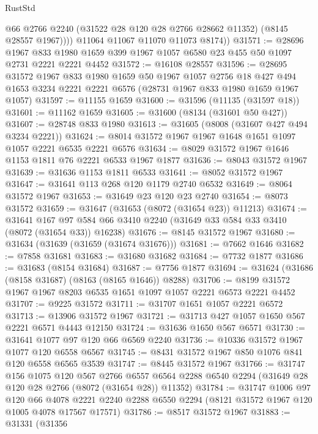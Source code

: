 \begin{lexlean}{RustStd}
\begin{coremodule}
              @66
              @2766
              @2240
              (@31522 @28 @120 @28 @2766 @28662 @11352)
              (@8145 @28557 @1967))))
        @11064
        @11067
        @11070
        @11073
        @8174))
@31571 := @28696
    @1967
    @833
    @1980
    @1659
    @399
    @1967
    @1057
    @6580
    @23
    @455
    @50
    @1097
    @2731
    @2221
    @2221
    @4452
@31572 := @16108 @28557
@31596 := @28695
    @31572
    @1967
    @833
    @1980
    @1659
    @50
    @1967
    @1057
    @2756
    @18
    @427
    @494
    @1653
    @3234
    @2221
    @2221
    @6576
    (@28731 @1967 @833 @1980 @1659 @1967 @1057)
@31597 := @11155 @1659
@31600 := @31596 (@11135 (@31597 @18))
@31601 := @11162 @1659
@31605 := @31600 (@8134 (@31601 @50 @427))
@31607 := @28748 @833 @1980
@31613 := @31605 (@8008 (@31607 @427 @494 @3234 @2221))
@31624 := @8014 @31572 @1967 @1967 @1648 @1651 @1097 @1057 @2221 @6535 @2221 @6576
@31634 := @8029 @31572 @1967 @1646 @1153 @1811 @76 @2221 @6533 @1967 @1877
@31636 := @8043 @31572 @1967
@31639 := @31636 @1153 @1811 @6533
@31641 := @8052 @31572 @1967
@31647 := @31641 @113 @268 @120 @1179 @2740 @6532
@31649 := @8064 @31572 @1967
@31653 := @31649 @23 @120 @23 @2740
@31654 := @8073 @31572
@31659 := @31647 (@31653 (@8072 (@31654 @23)) @11213)
@31674 := @31641
    @167
    @97
    @584
    @66
    @3410
    @2240
    (@31649 @33 @584 @33 @3410 (@8072 (@31654 @33)) @16238)
@31676 := @8145 @31572 @1967
@31680 := @31634 (@31639 (@31659 (@31674 @31676)))
@31681 := @7662 @1646
@31682 := @7858 @31681
@31683 := @31680 @31682
@31684 := @7732 @1877
@31686 := @31683 (@8154 @31684)
@31687 := @7756 @1877
@31694 := @31624 (@31686 (@8158 @31687) (@8163 (@8165 @1646)) @8288)
@31706 := @8199 @31572 @1967 @1967 @8203 @6535 @1651 @1097 @1057 @2221 @6573 @2221 @4452
@31707 := @9225 @31572
@31711 := @31707 @1651 @1057 @2221 @6572
@31713 := @13906 @31572 @1967
@31721 := @31713 @427 @1057 @1650 @567 @2221 @6571 @4443 @12150
@31724 := @31636 @1650 @567 @6571
@31730 := @31641 @1077 @97 @120 @66 @6569 @2240
@31736 := @10336 @31572 @1967 @1077 @120 @6558 @6567
@31745 := @8431 @31572 @1967 @850 @1076 @841 @120 @6558 @6565 @3539
@31747 := @8445 @31572 @1967
@31766 := @31747
    @156
    @1075
    @120
    @567
    @2766
    @6557
    @6564
    @2288
    @6540
    @2294
    (@31649 @28 @120 @28 @2766 (@8072 (@31654 @28)) @11352)
@31784 := @31747
    @1006
    @97
    @120
    @66
    @4078
    @2221
    @2240
    @2288
    @6550
    @2294
    (@8121 @31572 @1967 @120 @1005 @4078 @17567 @17571)
@31786 := @8517 @31572 @1967
@31883 := @31331
    (@31356

\end{coremodule}
\end{lexlean}
